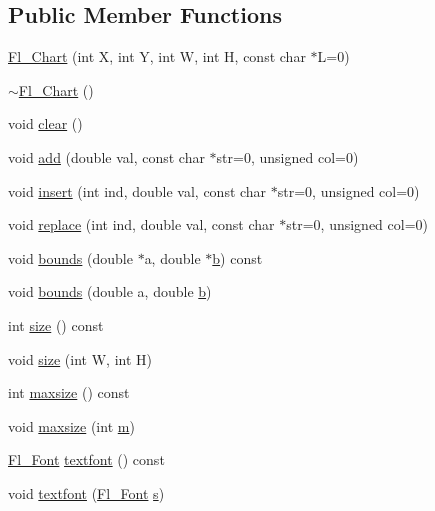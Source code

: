\subsection*{Public Member Functions}
\begin{DoxyCompactItemize}
\item 
\hyperlink{class_fl___chart_ab8564a05a9e558ad5b5b562e86a77fb2}{Fl\+\_\+\+Chart} (int X, int Y, int W, int H, const char $\ast$L=0)
\item 
\hyperlink{class_fl___chart_ad2001b6183ead9c3db024c877b140a0e}{$\sim$\+Fl\+\_\+\+Chart} ()
\item 
void \hyperlink{class_fl___chart_a4779938d0d2fe72349f1f40e34cccbbe}{clear} ()
\item 
void \hyperlink{class_fl___chart_ab45e570b04d13d0c366df960ebfeea20}{add} (double val, const char $\ast$str=0, unsigned col=0)
\item 
void \hyperlink{class_fl___chart_a089a59736fc83df0e3e635f666416b77}{insert} (int ind, double val, const char $\ast$str=0, unsigned col=0)
\item 
void \hyperlink{class_fl___chart_aaa2b08e9822cee55f318e925603eb451}{replace} (int ind, double val, const char $\ast$str=0, unsigned col=0)
\item 
void \hyperlink{class_fl___chart_a6782fd3e36ecec16dcc73e015c66ad8b}{bounds} (double $\ast$a, double $\ast$\hyperlink{forms_8_h_a0ba06a290a384fa06b1b90745827dae2}{b}) const
\item 
void \hyperlink{class_fl___chart_ae1701b8fd93cf1399dc22ef602d9f00d}{bounds} (double a, double \hyperlink{forms_8_h_a0ba06a290a384fa06b1b90745827dae2}{b})
\item 
int \hyperlink{class_fl___chart_a1c621c042c6f273e1c2243351e4afba6}{size} () const
\item 
void \hyperlink{class_fl___chart_a50625e04f40e8c30d4ee6e62699c5731}{size} (int W, int H)
\item 
int \hyperlink{class_fl___chart_ac49f97d8e5e82eb1471b25408dc2aacc}{maxsize} () const
\item 
void \hyperlink{class_fl___chart_a832be1890035c531c103d34058e71ca1}{maxsize} (int \hyperlink{forms_8_h_a2ccd5640c2b2869841c5dab22b937079}{m})
\item 
\hyperlink{_enumerations_8_h_a2ac46d9f082834b969fffe490a03a709}{Fl\+\_\+\+Font} \hyperlink{class_fl___chart_a999e93ef294afe5e8f43dff89a9019ad}{textfont} () const
\item 
void \hyperlink{class_fl___chart_a2a2b74d83ee1458eebf3f6e55de7fb76}{textfont} (\hyperlink{_enumerations_8_h_a2ac46d9f082834b969fffe490a03a709}{Fl\+\_\+\+Font} \hyperlink{forms_8_h_a672b4f0a8c8a6db61068c721f799d87f}{s})

\end{DoxyCompactItemize}
